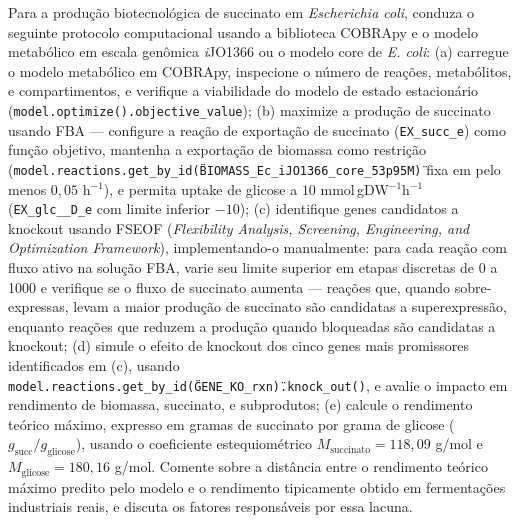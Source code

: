 \begin{exercicio}
Para a produção biotecnológica de succinato em \textit{Escherichia coli}, conduza o seguinte protocolo computacional usando a biblioteca COBRApy e o modelo metabólico em escala genômica \textit{i}JO1366 ou o modelo core de \textit{E. coli}: (a) carregue o modelo metabólico em COBRApy, inspecione o número de reações, metabólitos, e compartimentos, e verifique a viabilidade do modelo de estado estacionário (\texttt{model.optimize().objective\_value}); (b) maximize a produção de succinato usando FBA --- configure a reação de exportação de succinato (\texttt{EX\_succ\_e}) como função objetivo, mantenha a exportação de biomassa como restrição (\texttt{model.reactions.get\_by\_id(\"BIOMASS\_Ec\_iJO1366\_core\_53p95M\")} fixa em pelo menos $0{,}05$ h$^{-1}$), e permita uptake de glicose a $10$ mmol\,gDW$^{-1}$h$^{-1}$ (\texttt{EX\_glc\_\_D\_e} com limite inferior $-10$); (c) identifique genes candidatos a knockout usando FSEOF (\emph{Flexibility Analysis, Screening, Engineering, and Optimization Framework}), implementando-o manualmente: para cada reação com fluxo ativo na solução FBA, varie seu limite superior em etapas discretas de 0 a 1000 e verifique se o fluxo de succinato aumenta --- reações que, quando sobre-expressas, levam a maior produção de succinato são candidatas a superexpressão, enquanto reações que reduzem a produção quando bloqueadas são candidatas a knockout; (d) simule o efeito de knockout dos cinco genes mais promissores identificados em (c), usando \texttt{model.reactions.get\_by\_id(\"GENE\_KO\_rxn\").knock\_out()}, e avalie o impacto em rendimento de biomassa, succinato, e subprodutos; (e) calcule o rendimento teórico máximo, expresso em gramas de succinato por grama de glicose ($g_{\text{succ}}/g_{\text{glicose}}$), usando o coeficiente estequiométrico $M_{\text{succinato}} = 118{,}09$ g/mol e $M_{\text{glicose}} = 180{,}16$ g/mol. Comente sobre a distância entre o rendimento teórico máximo predito pelo modelo e o rendimento tipicamente obtido em fermentações industriais reais, e discuta os fatores responsáveis por essa lacuna.
\end{exercicio}

